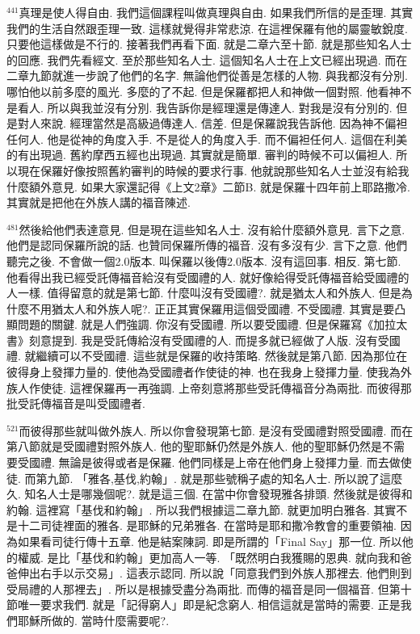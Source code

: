 \documentclass{book}
\begin{document}
$^{441}$真理是使人得自由.
我們這個課程叫做真理與自由.
如果我們所信的是歪理.
其實我們的生活自然跟歪理一致.
這樣就覺得非常悲涼.
在這裡保羅有他的屬靈敏銳度.
只要他這樣做是不行的.
接著我們再看下面.
就是二章六至十節.
就是那些知名人士的回應.
我們先看經文.
至於那些知名人士.
這個知名人士在上文已經出現過.
而在二章九節就進一步說了他們的名字.
無論他們從善是怎樣的人物.
與我都沒有分別.
哪怕他以前多麼的風光.
多麼的了不起.
但是保羅都把人和神做一個對照.
他看神不是看人.
所以與我並沒有分別.
我告訴你是經理還是傳達人.
對我是沒有分別的.
但是對人來說.
經理當然是高級過傳達人.
信差.
但是保羅說我告訴他.
因為神不偏袒任何人.
他是從神的角度入手.
不是從人的角度入手.
而不偏袒任何人.
這個在利美的有出現過.
舊約摩西五經也出現過.
其實就是簡單.
審判的時候不可以偏袒人.
所以現在保羅好像按照舊約審判的時候的要求行事.
他就說那些知名人士並沒有給我什麼額外意見.
如果大家還記得《上文2章》二節B.
就是保羅十四年前上耶路撒冷.
其實就是把他在外族人講的福音陳述.

$^{481}$然後給他們表達意見.
但是現在這些知名人士.
沒有給什麼額外意見.
言下之意.
他們是認同保羅所說的話.
也贊同保羅所傳的福音.
沒有多沒有少.
言下之意.
他們聽完之後.
不會做一個2.0版本.
叫保羅以後傳2.0版本.
沒有這回事.
相反.
第七節.
他看得出我已經受託傳福音給沒有受國禮的人.
就好像給得受託傳福音給受國禮的人一樣.
值得留意的就是第七節.
什麼叫沒有受國禮?.
就是猶太人和外族人.
但是為什麼不用猶太人和外族人呢?.
正正其實保羅用這個受國禮.
不受國禮.
其實是要凸顯問題的關鍵.
就是人們強調.
你沒有受國禮.
所以要受國禮.
但是保羅寫《加拉太書》刻意提到.
我是受託傳給沒有受國禮的人.
而提多就已經做了人版.
沒有受國禮.
就繼續可以不受國禮.
這些就是保羅的收持策略.
然後就是第八節.
因為那位在彼得身上發揮力量的.
使他為受國禮者作使徒的神.
也在我身上發揮力量.
使我為外族人作使徒.
這裡保羅再一再強調.
上帝刻意將那些受託傳福音分為兩批.
而彼得那批受託傳福音是叫受國禮者.

$^{521}$而彼得那些就叫做外族人.
所以你會發現第七節.
是沒有受國禮對照受國禮.
而在第八節就是受國禮對照外族人.
他的聖耶穌仍然是外族人.
他的聖耶穌仍然是不需要受國禮.
無論是彼得或者是保羅.
他們同樣是上帝在他們身上發揮力量.
而去做使徒.
而第九節.
「雅各,基伐,約翰」.
就是那些號稱子處的知名人士.
所以說了這麼久.
知名人士是哪幾個呢?.
就是這三個.
在當中你會發現雅各排頭.
然後就是彼得和約翰.
這裡寫「基伐和約翰」.
所以我們根據這二章九節.
就更加明白雅各.
其實不是十二司徒裡面的雅各.
是耶穌的兄弟雅各.
在當時是耶和撒冷教會的重要領袖.
因為如果看司徒行傳十五章.
他是結案陳詞.
即是所謂的「Final Say」那一位.
所以他的權威.
是比「基伐和約翰」更加高人一等.
「既然明白我獲賜的恩典.
就向我和爸爸伸出右手以示交易」.
這表示認同.
所以說「同意我們到外族人那裡去.
他們則到受局禮的人那裡去」.
所以是根據受盡分為兩批.
而傳的福音是同一個福音.
但第十節唯一要求我們.
就是「記得窮人」即是紀念窮人.
相信這就是當時的需要.
正是我們耶穌所做的.
當時什麼需要呢?.
\end{document}
